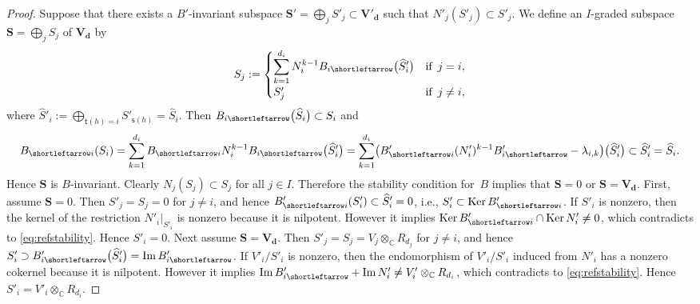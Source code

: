 \documentclass[pdftex]{sigma}
\newcommand{\slar}{\shortleftarrow}
\numberwithin{equation}{section}
\theoremstyle{definition}
\newcommand{\C}{\mathbb{C}} %
\newcommand{\Ker}{\operatorname{Ker}}
\newcommand{\range}{\operatorname{Im}}
\newcommand{\bV}{\mathbf{V}}
\newcommand{\bS}{\mathbf{S}}
\newcommand{\ved}{\mathbf{d}}
\newcommand{\hquad}{\hspace{.5em}}
\newcommand{\vin}{\mathsf{t}} %
\newcommand{\vout}{\mathsf{s}} %
\begin{document}
\begin{proof}
Suppose that there exists a $B'$-invariant subspace
$\bS'=\bigoplus_j S'_j {\subset} \bV'_\ved$ such that
$N'_j(S'_j) {\subset} S'_j$.
We def\/ine an $I$-graded subspace $\bS=\bigoplus_j S_j$ of
$\bV_\ved$ by
\[
S_j := \begin{cases}
\displaystyle \sum\limits_{k=1}^{d_i} N_i^{k-1} B_{i \slar}\bigl( \widehat{S}'_i \bigr)
& \text{if}\hquad j=i,\\
S'_j & \text{if}\hquad j \neq i,
\end{cases}
\]
where $\widehat{S}'_i := \bigoplus_{\vin(h)=i} S'_{\vout(h)} = \widehat{S}_i$.
Then $B_{i \slar}\bigl( \widehat{S}_i \bigr) \subset S_i$ and
\begin{gather*}
B_{\slar i} (S_i)  = \sum_{k=1}^{d_i}
B_{\slar i} N_i^{k-1} B_{i \slar}\bigl( \widehat{S}'_i \bigr)
 =\sum_{k=1}^{d_i}
\bigl( B'_{\slar i} (N'_i)^{k-1} B'_{i \slar} -\lambda_{i,k} \bigr)
\bigl( \widehat{S}'_i \bigr)
 \subset \widehat{S}'_i = \widehat{S}_i.
\end{gather*}
Hence $\bS$ is $B$-invariant.
Clearly $N_j(S_j) \subset S_j$ for all $j \in I$.
Therefore the stability condition for~$B$ implies that
$\bS=0$ or $\bS=\bV_\ved$.
First, assume $\bS=0$.
Then $S'_j=S_j=0$ for $j \neq i$, and hence
$B'_{\slar i}(S'_i) \subset \widehat{S}'_i=0$, i.e.,
$S'_i \subset \Ker B'_{\slar i}$.
If $S'_i$ is nonzero, then the kernel of the restriction
$N'_i |_{S'_i}$ is nonzero because it is nilpotent.
However it implies $\Ker B'_{\slar i} \cap \Ker N'_i \neq 0$,
which contradicts to \eqref{eq:refstability}.
Hence $S'_i=0$.
Next assume $\bS=\bV_\ved$.
Then $S'_j=S_j=V_j \otimes_\C R_{d_j}$ for $j \neq i$, and hence
$S'_i \supset B'_{i \slar}\bigl( \widehat{S}'_i \bigr) = \range B'_{i \slar}$.
If $V'_i/S'_i$ is nonzero,
then the endomorphism of $V'_i/S'_i$ induced from $N'_i$
has a nonzero cokernel because it is nilpotent.
However it implies
$\range B'_{i \slar} + \range N'_i \neq V'_i \otimes_\C R_{d_i}$,
which contradicts to \eqref{eq:refstability}.
Hence $S'_i=V'_i \otimes_\C R_{d_i}$.
\end{proof}
\end{document}
